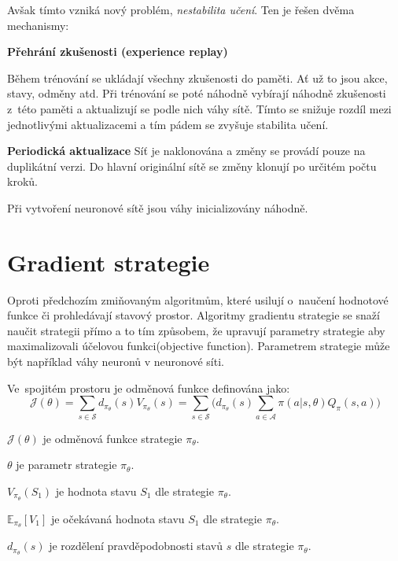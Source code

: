 Avšak tímto vzniká nový problém, \emph{nestabilita učení}.
Ten je řešen dvěma mechanismy:

\begin{myitemize}
  \item \textbf{Přehrání zkušenosti (experience replay)}
  
  Během trénování se ukládají všechny zkušenosti do paměti.
  Ať už to jsou akce, stavy, odměny atd.
  Při trénování se poté náhodně vybírají náhodně zkušenosti z~této paměti a aktualizují se podle nich váhy sítě.
  Tímto se snižuje rozdíl mezi jednotlivými aktualizacemi a tím pádem se zvyšuje stabilita učení.
  

  \item \textbf{Periodická aktualizace}
  Síť je naklonována a změny se provádí pouze na duplikátní verzi.
  Do hlavní originální sítě se změny klonují po určitém počtu kroků.

\end{myitemize}

Při vytvoření neuronové sítě jsou váhy inicializovány náhodně.

\section{Gradient strategie}\label{subsec:gradient-strategie}
Oproti předchozím zmiňovaným algoritmům, které usilují o~naučení hodnotové funkce či prohledávají stavový prostor.
Algoritmy gradientu strategie se snaží naučit strategii přímo a to tím způsobem, že upravují parametry strategie aby maximalizovali účelovou funkci(objective function).
Parametrem strategie může být například váhy neuronů v neuronové síti.

Ve~spojitém prostoru je odměnová funkce definována jako:
\begin{equation}
    \label{eq:ucelova_funkce_spojita}
  \mathcal{J}(\theta) = \sum_{s \in \mathcal{S}} d_{\pi_\theta}(s) V_{\pi_\theta}(s) = \sum_{s \in \mathcal{S}} \Big( d_{\pi_\theta}(s) \sum_{a \in \mathcal{A}} \pi(a \vert s, \theta) Q_\pi(s, a) \Big)
  \end{equation}

\begin{myitemize}
  \item $\mathcal{J}(\theta)$ je odměnová funkce strategie $\pi_\theta$.
  \item $\theta$ je parametr strategie $\pi_\theta$.
  \item $V_{\pi_\theta}(S_1)$ je hodnota stavu $S_1$ dle strategie $\pi_\theta$.
  \item $\mathbb{E}_{\pi_\theta}[V_1]$ je očekávaná hodnota stavu $S_1$ dle strategie $\pi_\theta$.
  \item $d_{\pi_\theta}(s)$ je rozdělení pravděpodobnosti stavů $s$ dle strategie $\pi_\theta$.
\end{myitemize}

